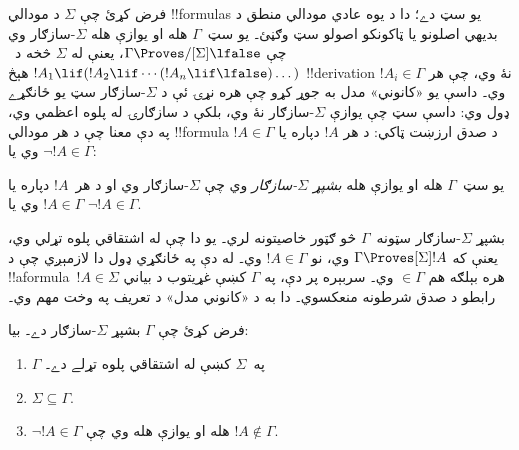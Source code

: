 \documentclass[../../../include/open-logic-section]{subfiles}
\begin{document}


فرض کړئ چې $\Sigma$ د مودالي !!{formula}s يو سټ دے؛ دا د يوه
عادي مودالي منطق د بديهي اصلونو يا ټاکونکو اصولو سټ وګڼئ۔ يو
سټ~$\Gamma$ هله او يوازې هله $\Sigma$-سازګار وي چې $\Gamma
\Proves/[\Sigma] \lfalse$، يعنې له $\Sigma$ څخه د~$!A_1 \lif
(!A_2 \lif \cdots (!A_n \lif \lfalse)\dots)$ هېڅ !!{derivation}
نۀ وي، چې هر $!A_i \in \Gamma$ وي۔ داسې يو «کانوني» مدل به جوړ
کړو چې هره نړۍ ئې د $\Sigma$-سازګار سټ يو ځانګړے ډول وي: داسې
سټ چې يوازې $\Sigma$-سازګار نۀ وي، بلکې د سازګارۍ له پلوه اعظمي وي،
په دې معنا چې د هر مودالي !!{formula} د صدق ارزښت ټاکي: د هر
$!A$ دپاره يا $!A \in \Gamma$ وي يا $\lnot !A \in \Gamma$:

\begin{defn}
  يو سټ~$\Gamma$ هله او يوازې هله \emph{بشپړ $\Sigma$-سازګار}
  وي چې $\Sigma$-سازګار وي او د هر~$!A$ دپاره يا $!A \in \Gamma$
  وي يا $\lnot !A \in \Gamma$.
\end{defn}

بشپړ $\Sigma$-سازګار سټونه~$\Gamma$ څو ګټور خاصيتونه لري۔ يو
دا چې له اشتقاقي پلوه تړلي وي، يعنې که $\Gamma \Proves[\Sigma]
!A$ وي، نو $!A \in \Gamma$ وي۔ له دې په ځانګړي ډول دا لازمېږي
چې د !!a{formula}~$!A \in \Sigma$ هره بېلګه هم $\in \Gamma$ وي۔
سربېره پر دې، په $\Gamma$ کښې غړيتوب د بياني رابطو د صدق شرطونه
منعکسوي۔ دا به د «کانوني مدل» د تعريف په وخت مهم وي۔

\begin{prop}
  فرض کړئ چې $\Gamma$ بشپړ $\Sigma$-سازګار دے۔ بيا:
  \begin{enumerate}
  \item {}%
    $\Gamma$ په~$\Sigma$ کښې له اشتقاقي پلوه تړلے دے۔
  \item {}%
    $\Sigma \subseteq \Gamma$.
  \item {}%
    $\lnot!A \in \Gamma$ هله او يوازې هله وي چې $!A \notin
    \Gamma$.
  \end{enumerate}
\end{prop}
\end{document}
